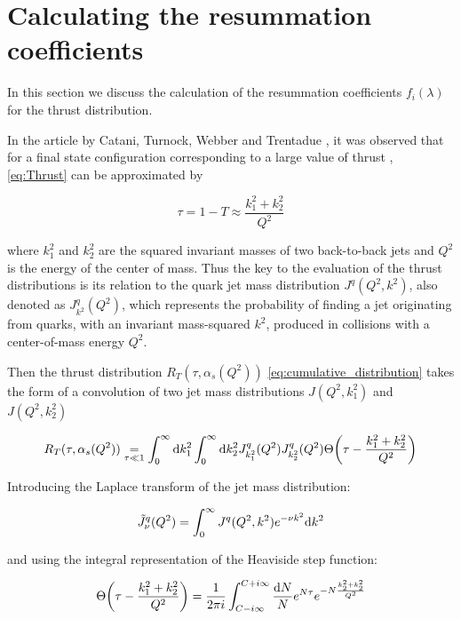 \documentclass[../main.tex]{subfiles}
\begin{document}
\section{Calculating the resummation coefficients}\label{sec:f_coeff}

In this section we discuss the calculation of the resummation coefficients $f_i(\lambda)$ for the thrust distribution.

In the article by Catani, Turnock, Webber and Trentadue \cite{CATANI1991491}, it was observed that 
for a final state configuration corresponding to a large value of thrust , \cref{eq:Thrust} can be approximated by

\begin{equation} \label{eq:Thrust_approx}
    \tau = 1-T \approx \frac{k_1^2+k_2^2}{Q^2}
\end{equation}

where $k_1^2$ and $k_2^2$ are the squared invariant masses of two back-to-back jets and $Q^2$ is the energy of the center of mass.
Thus the key to the evaluation of the thrust distributions is its relation to the quark jet mass distribution $J^q(Q^2,k^2)$, also denoted as $J^q_{k^2}(Q^2)$, which represents
the probability of finding a jet originating from quarks, with an invariant mass-squared $k^2$, produced in collisions with a center-of-mass energy $Q^2$.

Then the thrust distribution $R_T(\tau,\alpha_s(Q^2))$ \cref{eq:cumulative_distribution}
takes the form of a convolution of two jet mass distributions $J(Q^2,k_1^2)$ and $J(Q^2,k_2^2)$

\begin{equation}\label{eq:Thrust fraction convolution}
    R_T(\tau,\alpha_s(Q^2)) \underset{\tau \ll 1}{=} \int_0^\infty \dd k_1^2 \int_0^\infty  \dd k_2^2 J^q_{k_1^2}(Q^2) J^q_{k_2^2}(Q^2) \Theta\qty(\tau - \frac{k_1^2+k_2^2}{Q^2}) 
\end{equation}

Introducing the Laplace transform of the jet mass distribution:

\begin{equation}\label{eq:laplace_jet_mass}
    \Tilde{J}^q_\nu(Q^2) = \int_0^\infty J^q(Q^2,k^2) e^{-\nu k^2} \dd k^2 
\end{equation}

and using the integral representation of the Heaviside step function:

\begin{equation} \label{eq:heaviside_integral_representation}
    \Theta\qty(\tau - \frac{k_1^2+k_2^2}{Q^2}) = \frac{1}{2\pi i} \int_{C-i\infty}^{C+i\infty} \frac{\dd N}{N} e^{N \tau} e^{- N \frac{k_2^2+k_2^2}{Q^2}} 
\end{equation}
\end{document}
